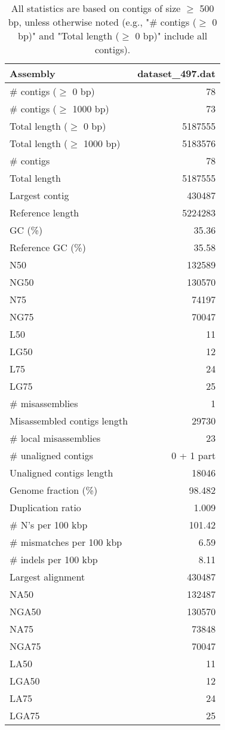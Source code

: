 \documentclass[12pt,a4paper]{article}
\begin{document}
\begin{table}[ht]
\begin{center}
\caption{All statistics are based on contigs of size $\geq$ 500 bp, unless otherwise noted (e.g., "\# contigs ($\geq$ 0 bp)" and "Total length ($\geq$ 0 bp)" include all contigs).}
\begin{tabular}{|l*{1}{|r}|}
\hline
Assembly & dataset\_497.dat \\ \hline
\# contigs ($\geq$ 0 bp) & 78 \\ \hline
\# contigs ($\geq$ 1000 bp) & 73 \\ \hline
Total length ($\geq$ 0 bp) & 5187555 \\ \hline
Total length ($\geq$ 1000 bp) & 5183576 \\ \hline
\# contigs & 78 \\ \hline
Total length & 5187555 \\ \hline
Largest contig & 430487 \\ \hline
Reference length & 5224283 \\ \hline
GC (\%) & 35.36 \\ \hline
Reference GC (\%) & 35.58 \\ \hline
N50 & 132589 \\ \hline
NG50 & 130570 \\ \hline
N75 & 74197 \\ \hline
NG75 & 70047 \\ \hline
L50 & 11 \\ \hline
LG50 & 12 \\ \hline
L75 & 24 \\ \hline
LG75 & 25 \\ \hline
\# misassemblies & 1 \\ \hline
Misassembled contigs length & 29730 \\ \hline
\# local misassemblies & 23 \\ \hline
\# unaligned contigs & 0 + 1 part \\ \hline
Unaligned contigs length & 18046 \\ \hline
Genome fraction (\%) & 98.482 \\ \hline
Duplication ratio & 1.009 \\ \hline
\# N's per 100 kbp & 101.42 \\ \hline
\# mismatches per 100 kbp & 6.59 \\ \hline
\# indels per 100 kbp & 8.11 \\ \hline
Largest alignment & 430487 \\ \hline
NA50 & 132487 \\ \hline
NGA50 & 130570 \\ \hline
NA75 & 73848 \\ \hline
NGA75 & 70047 \\ \hline
LA50 & 11 \\ \hline
LGA50 & 12 \\ \hline
LA75 & 24 \\ \hline
LGA75 & 25 \\ \hline
\end{tabular}
\end{center}
\end{table}
\end{document}

